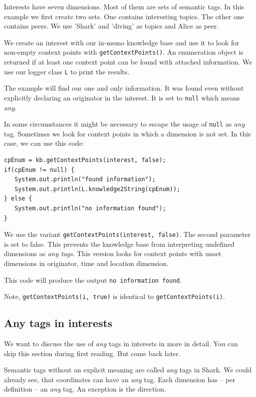Interests have seven dimensions. Most of them are sets of semantic tags. In this example we first create two sets. One contains interesting topics. The other one contains peers. We use 'Shark' and 'diving' as topics and Alice as peer.

We create an interest with our in-memo knowledge base and use it to look for non-empty context points with {\tt getContextPoints()}. An enumeration object is returned if at least one context point can be found with attached information.
We use our logger class {\tt L} to print the results. 

The example will find our one and only information. It was found even without explicitly declaring an originator in the interest. It is set to {\tt null} which means {\it any}. 

In some circumstances it might be necessary to escape the usage of {\tt null} as {\it any} tag. Sometimes we look for context points in which a dimension is not set. In this case, we can use this code:

\begin{verbatim}
cpEnum = kb.getContextPoints(interest, false);
if(cpEnum != null) {
   System.out.println("found information");
   System.out.println(L.knowledge2String(cpEnum));
} else {
   System.out.println("no information found");
}
\end{verbatim}

We use the variant {\tt getContextPoints(interest, false)}. The second parameter is set to false. This prevents the knowledge base from interpreting undefined dimensions as {\it any tags}. This version looks for context points with unset dimensions in originator, time and location dimension.

This code will produce the output {\tt no information found}.

Note, {\tt getContextPoints(i, true)} is identical to {\tt getContextPoints(i)}.

\subsection{Any tags in interests}
We want to discuss the use of {\it any} tags in interests in more in detail. You can skip this section during first reading. But come back later. 

Semantic tags without an explicit meaning are called {\it any} tags in Shark.
We could already see, that coordinates can have an {\it any} tag. Each dimension has -- per definition -- an {\it any} tag. An exception is the direction.

